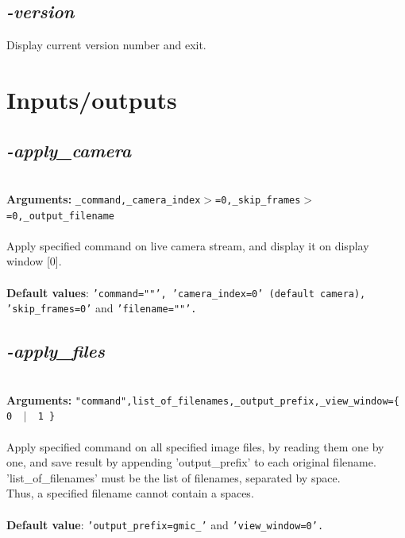 \documentclass[a4paper,11pt,twoside]{book}
\begin{document}
\subsection{\emph{-version} }\vspace*{-0.5em}
Display current version number and exit.

\section{Inputs/outputs}


\subsection{\emph{-apply\_camera} }\vspace*{-0.5em}
~\\\textbf{Arguments: } 
{\small \texttt{\_command,\_camera\_index$>$=0,\_skip\_frames$>$=0,\_output\_filename}}\\~\\
Apply specified command on live camera stream, and display it on display window [0].
~\\~\\\textbf{Default values}: {\small \texttt{'command=""', 'camera\_index=0' (default camera), 'skip\_frames=0'} and \texttt{'filename=""'.}}


\subsection{\emph{-apply\_files} }\vspace*{-0.5em}
~\\\textbf{Arguments: } 
{\small \texttt{"command",list\_of\_filenames,\_output\_prefix,\_view\_window=\{ 0 ~$|$~ 1 \}}}\\~\\
Apply specified command on all specified image files, by reading them one by one,
and save result by appending 'output\_prefix' to each original filename.
~\\'list\_of\_filenames' must be the list of filenames, separated by space.
~\\Thus, a specified filename cannot contain a spaces.
~\\~\\\textbf{Default value}: {\small \texttt{'output\_prefix=gmic\_'} and \texttt{'view\_window=0'.}}
\end{document}
